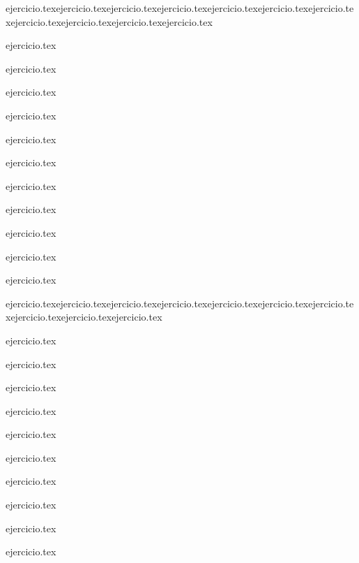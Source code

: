 \begin{enumerate}
    \setcounter{enumi}{14}
    \begin{minipage}{0.45\textwidth}
    {ejercicio.tex}{ejercicio.tex}{ejercicio.tex}{ejercicio.tex}{ejercicio.tex}{ejercicio.tex}{ejercicio.tex}{ejercicio.tex}{ejercicio.tex}{ejercicio.tex}{ejercicio.tex}\end{minipage}%
    \begin{minipage}{0.45\textwidth}
    \setcounter{enumi}{15}
    {ejercicio.tex}\addtocounter{enumi}{1}
    {ejercicio.tex}\addtocounter{enumi}{1}
    {ejercicio.tex}\addtocounter{enumi}{1}
    {ejercicio.tex}\addtocounter{enumi}{1}
    {ejercicio.tex}\addtocounter{enumi}{1}
    {ejercicio.tex}\addtocounter{enumi}{1}
    {ejercicio.tex}\addtocounter{enumi}{1}
    {ejercicio.tex}\addtocounter{enumi}{1}
    {ejercicio.tex}\addtocounter{enumi}{1}
    {ejercicio.tex}\addtocounter{enumi}{1}
    {ejercicio.tex}\end{minipage}
\end{enumerate}

\vspace{1em}
\begin{enumerate}
    \setcounter{enumi}{36}
    \begin{minipage}{0.45\textwidth}
    {ejercicio.tex}{ejercicio.tex}{ejercicio.tex}{ejercicio.tex}{ejercicio.tex}{ejercicio.tex}{ejercicio.tex}{ejercicio.tex}{ejercicio.tex}{ejercicio.tex}\end{minipage}%
    \begin{minipage}{0.45\textwidth}
    \setcounter{enumi}{37}
    {ejercicio.tex}\addtocounter{enumi}{1}
    {ejercicio.tex}\addtocounter{enumi}{1}
    {ejercicio.tex}\addtocounter{enumi}{1}
    {ejercicio.tex}\addtocounter{enumi}{1}
    {ejercicio.tex}\addtocounter{enumi}{1}
    {ejercicio.tex}\addtocounter{enumi}{1}
    {ejercicio.tex}\addtocounter{enumi}{1}
    {ejercicio.tex}\addtocounter{enumi}{1}
    {ejercicio.tex}\addtocounter{enumi}{1}
    {ejercicio.tex}\end{minipage}
\end{enumerate}

